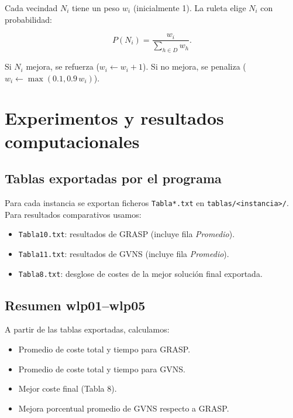 \documentclass[12pt, a4paper]{report}
\begin{document}
Cada vecindad $N_i$ tiene un peso $w_i$ (inicialmente 1). La ruleta elige $N_i$ con probabilidad:

\[
P(N_i) = \frac{w_i}{\sum_{h \in D} w_h}.
\]

Si $N_i$ mejora, se refuerza ($w_i \leftarrow w_i + 1$). Si no mejora, se penaliza ($w_i \leftarrow \max(0.1, 0.9\,w_i)$).


\chapter{Experimentos y resultados computacionales}

\section{Tablas exportadas por el programa}

Para cada instancia se exportan ficheros \texttt{Tabla*.txt} en \texttt{tablas/<instancia>/}. Para resultados comparativos usamos:

\begin{itemize}
  \item \texttt{Tabla10.txt}: resultados de GRASP (incluye fila \emph{Promedio}).
  \item \texttt{Tabla11.txt}: resultados de GVNS (incluye fila \emph{Promedio}).
  \item \texttt{Tabla8.txt}: desglose de costes de la mejor solución final exportada.
\end{itemize}

\section{Resumen wlp01--wlp05}

A partir de las tablas exportadas, calculamos:

\begin{itemize}
  \item Promedio de coste total y tiempo para GRASP.
  \item Promedio de coste total y tiempo para GVNS.
  \item Mejor coste final (Tabla 8).
  \item Mejora porcentual promedio de GVNS respecto a GRASP.
\end{itemize}
\end{document}
